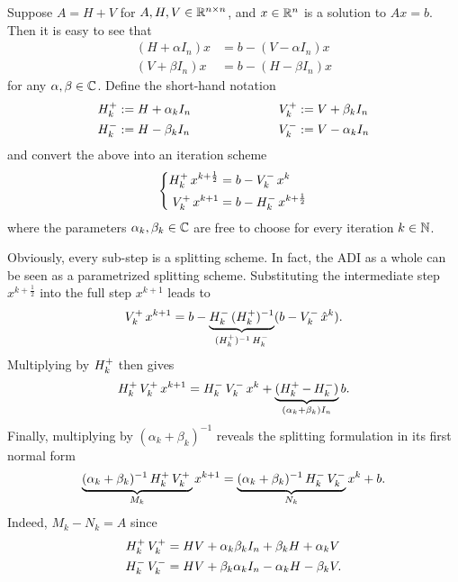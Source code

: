 Suppose $A=H+V$ for $A, H, V \in \mathbb{R}^{n\times n}$,
and $x\in\mathbb{R}^n$ is a solution to $Ax=b$.
Then it is easy to see that
\begin{equation}
\begin{aligned}
  (H + \alpha I_n)x &= b - (V - \alpha I_n) x \\
  (V + \beta I_n)x &= b - (H - \beta I_n) x
\end{aligned}
\end{equation}
for any $\alpha, \beta \in\mathbb{C}$.
Define the short-hand notation
\begin{equation}
\label{eq:adi:shorthand}
\begin{aligned}
  \Aip  &:= H + \alpha_k I_n &
  \qquad\qquad\qquad %
  \Aiip &:= V + \beta_k  I_n \\
  \Aim  &:= H - \beta_k  I_n &
  \Aiim &:= V - \alpha_k I_n
\end{aligned}
\end{equation}
and convert the above into an iteration scheme
\begin{equation}
  \label{eq:adi:general2step}
  \left\{
  \begin{aligned}
    \mathop{H_k^+}  x^{k+\frac{1}{2}} &= b - \mathop{V_k^-} x^k \\
    \mathop{V_k^+} x^{k+1}           &= b - \mathop{H_k^-} x^{k+\frac{1}{2}}
  \end{aligned}
  \right.
\end{equation}
where the parameters $\alpha_k, \beta_k \in\mathbb{C}$ are free to choose for every iteration $k\in\mathbb{N}$.

Obviously, every sub-step is a splitting scheme.
In fact, the ADI as a whole can be seen as a parametrized splitting scheme.
Substituting the intermediate step $x^{k+\frac{1}{2}}$ into the full step $x^{k+1}$ leads to
\begin{equation}
  \mathop{V_k^+} x^{k+1}
  = b - \underbrace{
    \mathop{H_k^-}\mathop{(\mathop{H_k^+})^{-1}}
  }_{\mathop{(\mathop{H_k^+})^{-1}}\mathop{H_k^-}}
  (b - \mathop{V_k^-} \hat x^k)
  .
\end{equation}
Multiplying by $\mathop{H_k^+}$ then gives
\begin{equation}
  \Aip\Aiip x^{k+1} = \Aim\Aiim x^k +
  \underbrace{%
  (\Aip - \Aim)
  }_{(\alpha_k + \beta_k) I_n}
  b
  .
\end{equation}
Finally, multiplying by $(\alpha_k + \beta_k)^{-1}$ reveals the splitting formulation in its first normal form
\begin{equation}
\label{eq:adi:general1step}
  \underbrace{
    (\alpha_k + \beta_k)^{-1} \mathop{H_k^+}\mathop{V_k^+} \\
  }_{M_k}
  x^{k+1} =
  \underbrace{
    (\alpha_k + \beta_k)^{-1} \mathop{H_k^-}\mathop{V_k^-}
  }_{N_k}
  x^k + b
  .
\end{equation}
Indeed, $M_k - N_k = A$ since
\begin{equation}
\begin{aligned}
  \mathop{H_k^+}\mathop{V_k^+} &= HV + \alpha_k\beta_k I_n + \beta_k H + \alpha_k V \\
  \mathop{H_k^-}\mathop{V_k^-} &= HV + \beta_k\alpha_k I_n - \alpha_k H - \beta_k V
  .
\end{aligned}
\end{equation}

